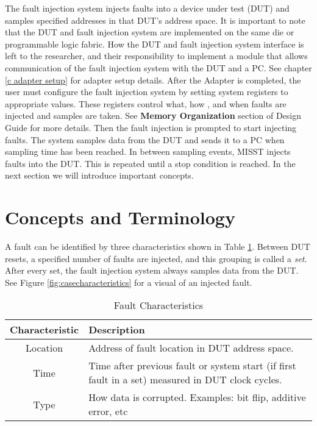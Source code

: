 \documentclass[]{report}
\begin{document}
The fault injection system injects faults into a device under test (DUT) and samples specified addresses in that DUT's address space. It is important to note that the DUT and fault injection system are implemented on the same die or programmable logic fabric. How the DUT and fault injection system interface is left to the researcher, and their responsibility to implement a module that allows communication of the fault injection system with the DUT and a PC. See chapter \ref{c adapter setup} for adapter setup details.
After the Adapter is completed, the user must configure the fault injection system by setting system registers to appropriate values. These registers control what, how , and when faults are injected and samples are taken. See \textbf{Memory Organization} section of Design Guide for more details. Then the fault injection is prompted to start injecting faults. The system samples data from the DUT and sends it to a PC when sampling time has been reached. In between sampling events, MISST injects faults into the DUT. This is repeated until a stop condition is reached.
In the next section we will introduce important concepts.

\section{Concepts and Terminology}
\label{concepts and terminology}

A fault can be identified by three characteristics shown in Table \ref{table:fault chars}. Between DUT resets, a specified number of faults are injected, and this grouping is called a \textit{set}. After every set, the fault injection system always samples data from the DUT. See Figure \ref{fig:casecharacteristics} for a visual of an injected fault.

\begin{table}[h]
	\centering
	\caption{Fault Characteristics}
	\begin{tabular}{|c|l|}
		\hline
		Characteristic & Description \\ 
		\hline
		Location & Address of fault location in DUT address space. \\ 
		\hline 
		Time & Time after previous fault or system start (if first fault in a set) measured in DUT clock cycles. \\ 
		\hline 
		Type & How data is corrupted. Examples: bit flip, additive error, etc \\ 
		\hline 
	\end{tabular} 
	\label{table:fault chars}
\end{table}
\end{document}
